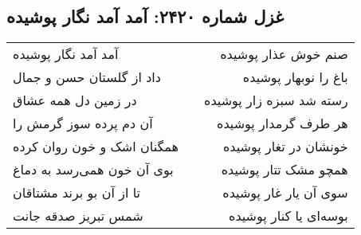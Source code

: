 \begin{center}
\section*{غزل شماره ۲۴۲۰: آمد آمد نگار پوشیده}
\label{sec:2420}
\begin{longtable}{l p{0.5cm} r}
آمد آمد نگار پوشیده
&&
صنم خوش عذار پوشیده
\\
داد از گلستان حسن و جمال
&&
باغ را نوبهار پوشیده
\\
در زمین دل همه عشاق
&&
رسته شد سبزه زار پوشیده
\\
آن دم پرده سوز گرمش را
&&
هر طرف گرمدار پوشیده
\\
همگنان اشک و خون روان کرده
&&
خونشان در تغار پوشیده
\\
بوی آن خون همی‌رسد به دماغ
&&
همچو مشک تتار پوشیده
\\
تا از آن بو برند مشتاقان
&&
سوی آن یار غار پوشیده
\\
شمس تبریز صدقه جانت
&&
بوسه‌ای یا کنار پوشیده
\\
\end{longtable}
\end{center}
